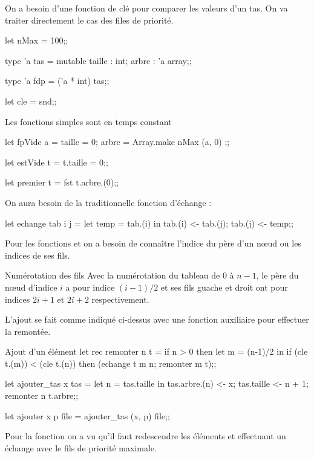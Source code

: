 On a besoin d'une fonction de clé pour comparer les valeurs d'un tas. On va traiter directement le cas des files de priorité.
\begin{ocaml}
let nMax = 100;;

type 'a tas = {mutable taille : int; 
                        arbre : 'a array};;
                        
type 'a fdp = ('a * int) tas;;

let cle = snd;;
\end{ocaml}
Les fonctions simples sont en temps constant
\begin{ocaml}
let fpVide a =
  {taille = 0; arbre = Array.make nMax (a, 0) };;

let estVide t =  
  t.taille = 0;;

let premier t = 
  fst t.arbre.(0);;
\end{ocaml}
On aura besoin de la traditionnelle fonction d'échange :
\begin{ocaml}
let echange tab i j =
      let temp = tab.(i) in
      tab.(i) <- tab.(j);
      tab.(j) <- temp;;
\end{ocaml}

Pour les fonctions  et  on a besoin de connaître l'indice du père d'un nœud ou les indices de ses fils.
\begin{thm}{Numérotation des fils}{}
Avec la numérotation du tableau de 0 à $n-1$, le père du nœud d'indice $i$ a pour indice $(i-1)/2$ et ses fils guache et droit ont pour indices $2i +1$ et $2i+2$ respectivement.
\end{thm}

L'ajout se fait comme indiqué ci-dessus avec une fonction auxiliaire pour effectuer la remontée.
\begin{code}{Ajout d'un élément}
let rec remonter n t =
   if n > 0
      then let m = (n-1)/2 in
         if (cle t.(m)) < (cle t.(n))
         then (echange t m n; remonter m t);;

let ajouter_tas x tas  =
  let n = tas.taille in
    tas.arbre.(n) <- x;
    tas.taille <- n + 1;
    remonter n t.arbre;;
    
let ajouter x p file = ajouter_tas (x, p) file;;
\end{code}
Pour la fonction  on a vu qu'il faut redescendre les éléments et effectuant un échange avec le fils de priorité maximale. 

